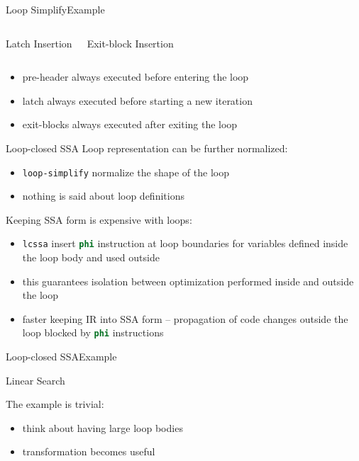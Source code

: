 \documentclass[10pt,mathserif]{beamer}
\newcommand{\cinput}[1]{}
\newcommand{\llvminline}[1]{\lstinline[language=LLVM]!#1!}
\begin{document}
\begin{frame}{Loop Simplify}{Example}
\begin{columns}[t]
\begin{block}{Latch Insertion}
\centering

\end{block}

\begin{block}{Exit-block Insertion}
\centering

\end{block}
\end{columns}

\begin{itemize}
\item pre-header always executed before entering the loop
\item latch always executed before starting a new iteration
\item exit-blocks always executed after exiting the loop
\end{itemize}
\end{frame}

\begin{frame}{Loop-closed SSA}
Loop representation can be further normalized:

\begin{itemize}
\item \texttt{loop-simplify} normalize the \alert{shape} of the loop
\item nothing is said about loop definitions
\end{itemize}

\vfill
Keeping SSA form is expensive with loops:

\begin{itemize}
\item \texttt{lcssa} insert \llvminline{phi} instruction at loop boundaries for
      variables \alert{defined inside} the loop body and \alert{used outside}
\item this guarantees isolation between optimization performed inside and outside
      the loop
\item faster keeping IR into SSA form -- propagation of code changes outside the
      loop blocked by \llvminline{phi} instructions
\end{itemize}
\end{frame}

\begin{frame}{Loop-closed SSA}{Example}
\begin{block}{Linear Search}
\centering
\cinput{snippet/02/lcssa.c}
\end{block}

\vfill
The example is trivial:

\begin{itemize}
\item think about having large loop bodies
\item transformation becomes useful
\end{itemize}
\end{frame}
\end{document}
